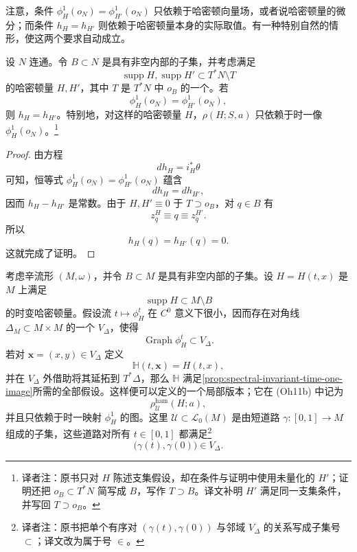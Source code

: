 注意，条件 $\phi_H^1(o_N)=\phi_{H'}^1(o_N)$ 只依赖于哈密顿向量场，或者说哈密顿量的微分；而条件 $h_H=h_{H'}$ 则依赖于哈密顿量本身的实际取值。有一种特别自然的情形，使这两个要求自动成立。

\begin{proposition}
\label{prop:spectral-invariant-time-one-image}
设 $N$ 连通。令 $B\subset N$ 是具有非空内部的子集，并考虑满足
\[
  \operatorname{supp}H,\operatorname{supp}H'
  \subset T^*N\setminus T
\]
的哈密顿量 $H,H'$，其中 $T$ 是 $T^*N$ 中 $o_B$ 的一个\termTubularNeighborhood{}。若
\[
  \phi_H^1(o_N)=\phi_{H'}^1(o_N),
\]
则 $h_H=h_{H'}$。特别地，对这样的哈密顿量 $H$，$\rho(H;S,a)$ 只依赖于时一像 $\phi_H^1(o_N)$。\footnote{译者注：原书只对 $H$ 陈述支集假设，却在条件与证明中使用未量化的 $H'$；证明还把 $o_B\subset T^*N$ 简写成 $B$，写作 $T\supset B$。译文补明 $H'$ 满足同一支集条件，并写回 $T\supset o_B$。}
\end{proposition}

\begin{proof}
由方程
\[
  dh_H=i_H^*\theta
\]
可知，恒等式 $\phi_H^1(o_N)=\phi_{H'}^1(o_N)$ 蕴含
\[
  dh_H=dh_{H'},
\]
因而 $h_H-h_{H'}$ 是常数。由于 $H,H'\equiv0$ 于 $T\supset o_B$，对 $q\in B$ 有
\[
  z_q^H\equiv q\equiv z_q^{H'}.
\]
所以
\[
  h_H(q)=h_{H'}(q)=0.
\]
这就完成了证明。
\end{proof}

\begin{example}
\label{ex:local-hamiltonian-spectral-invariant}
考虑辛流形 $(M,\omega)$，并令 $B\subset M$ 是具有非空内部的子集。设 $H=H(t,x)$ 是 $M$ 上满足
\[
  \operatorname{supp}H\subset M\setminus B
\]
的时变哈密顿量。假设流 $t\longmapsto\phi_H^t$ 在 $C^0$ 意义下很小，因而存在对角线 $\Delta_M\subset M\times M$ 的一个\termDarbouxWeinsteinNeighborhood{} $V_\Delta$，使得
\[
  \operatorname{Graph}\phi_H^t\subset V_\Delta.
\]
若对 $\mathbf x=(x,y)\in V_\Delta$ 定义
\[
  \mathbb H(t,\mathbf x)=H(t,x),
\]
并在 $V_\Delta$ 外借助\termCutOffFunction{}将其延拓到 $T^*\Delta$，那么 $\mathbb H$ 满足\cref{prop:spectral-invariant-time-one-image}所需的全部假设。这样便可以定义\termHamiltonianSpectralInvariant{}的一个局部版本；它在 (Oh11b) 中记为
\[
  \rho_{\mathcal U}^{\mathrm{ham}}(H;a),
\]
并且只依赖于时一映射 $\phi_H^1$ 的图。这里 $\mathcal U\subset\mathcal L_0(M)$ 是由短道路 $\gamma:[0,1]\to M$ 组成的子集，这些道路对所有 $t\in[0,1]$ 都满足\footnote{译者注：原书把单个有序对 $(\gamma(t),\gamma(0))$ 与邻域 $V_\Delta$ 的关系写成子集号 $\subset$；译文改为属于号 $\in$。}
\[
  \bigl(\gamma(t),\gamma(0)\bigr)\in V_\Delta.
\]
\end{example}
